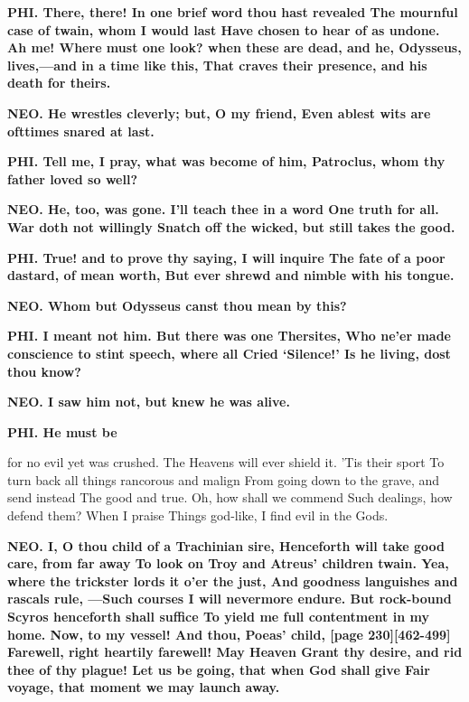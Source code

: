 \documentclass[11pt,letter]{book}
\begin{document}
\par \textbf{PHI. There, there! In one brief word thou hast revealed The mournful case of twain, whom I would last Have chosen to hear of as undone. Ah me! Where must one look? when these are dead, and he, Odysseus, lives,—and in a time like this, That craves their presence, and his death for theirs.}
\par 

\par \textbf{NEO. He wrestles cleverly; but, O my friend, Even ablest wits are ofttimes snared at last.}
\par 

\par \textbf{PHI. Tell me, I pray, what was become of him, Patroclus, whom thy father loved so well?}
\par 

\par \textbf{NEO. He, too, was gone. I’ll teach thee in a word One truth for all. War doth not willingly Snatch off the wicked, but still takes the good.}
\par 

\par \textbf{PHI. True! and to prove thy saying, I will inquire The fate of a poor dastard, of mean worth, But ever shrewd and nimble with his tongue.}
\par 

\par \textbf{NEO. Whom but Odysseus canst thou mean by this?}
\par 

\par \textbf{PHI. I meant not him. But there was one Thersites, Who ne’er made conscience to stint speech, where all Cried ‘Silence!’ Is he living, dost thou know?}
\par 

\par \textbf{NEO. I saw him not, but knew he was alive.}
\par 

\par \textbf{PHI. He must be}
\par   for no evil yet was crushed. The Heavens will ever shield it. ’Tis their sport To turn back all things rancorous and malign From going down to the grave, and send instead The good and true. Oh, how shall we commend Such dealings, how defend them? When I praise Things god-like, I find evil in the Gods.

\par \textbf{NEO. I, O thou child of a Trachinian sire, Henceforth will take good care, from far away To look on Troy and Atreus’ children twain. Yea, where the trickster lords it o’er the just, And goodness languishes and rascals rule, —Such courses I will nevermore endure. But rock-bound Scyros henceforth shall suffice To yield me full contentment in my home. Now, to my vessel! And thou, Poeas’ child, [page 230][462-499] Farewell, right heartily farewell! May Heaven Grant thy desire, and rid thee of thy plague! Let us be going, that when God shall give Fair voyage, that moment we may launch away.}
\par 
\end{document}
